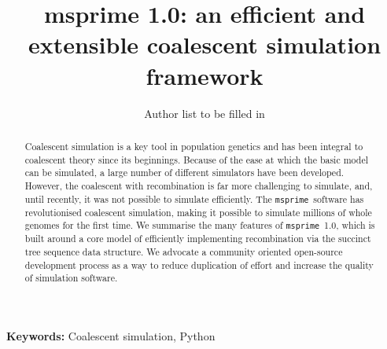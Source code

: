\documentclass{article}
\newcommand{\msprime}[0]{\texttt{msprime}}
\begin{document}
\title{msprime 1.0: an efficient and extensible coalescent simulation framework}
\author{Author list to be filled in
}


\maketitle



\begin{abstract}
Coalescent simulation is a key tool in population genetics and
has been integral to coalescent theory since its beginnings.
Because of the ease at which the basic model can be simulated,
a large number of different simulators have been developed. However,
the coalescent with recombination is far more challenging to simulate,
and, until recently, it was not possible to simulate efficiently.
The \msprime\ software has revolutionised
coalescent simulation, making it possible to simulate millions
of whole genomes for the first time. We summarise the many features
of \msprime\ 1.0, which is built around a core model of efficiently
implementing recombination via the succinct tree sequence data
structure. We advocate a community oriented open-source development
process as a way to reduce duplication of effort and increase
the quality of simulation software.
\end{abstract}

\textbf{Keywords:} Coalescent simulation, Python

\end{document}
